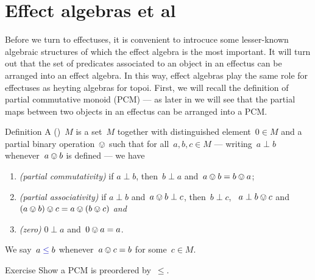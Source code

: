 \documentclass[b]{subfiles}
\begin{document}
\section{Effect algebras et al}
\begin{parsec}%
\begin{point}%
Before we turn to effectuses,
    it is convenient to introcuce some lesser-known algebraic structures
    of which the effect algebra is the most important.
It will turn out that the set of predicates associated to an object in
    an effectus can be arranged into an effect algebra.
In this way, effect algebras play the same role
    for effectuses as heyting algebras for topoi.
    First, we will recall the definition of partial commutative monoid (PCM)
    --- as later in  
    we will see that the partial maps between
    two objects in an effectus can be arranged into a PCM.
\end{point}
\begin{point}{Definition}%
    A  ()~$M$
        is a set~$M$ together with distinguished element~$0 \in M$
        and a partial binary operation~$\ovee$ such that
        for all~$a,b,c \in M$ 
        --- writing~$a \perp b$ whenever~$a \ovee b$ is defined
        --- we have
\begin{enumerate}
    \item \emph{(partial commutativity)}
        if $a \perp b$, then~$b \perp a$ and~$a \ovee b = b \ovee a$;
    \item \emph{(partial associativity)}
        if $a \perp b$ and~$a \ovee b \perp c$,
        then~$b \perp c$, ~$a \perp b \ovee c$
            and~$(a \ovee b) \ovee c = a \ovee (b \ovee c)$ \emph{and}
    \item \emph{(zero)}
        $0 \perp a$ and~$0 \ovee a = a$.
\end{enumerate}
We say~$a\mathrel{\Define{\leq}} b$
    whenever~$a \ovee c = b$ for some~$c \in M$.
\end{point}
\begin{point}{Exercise}%
Show a PCM is preordered by~$\leq$.
\end{point}
\end{parsec}
\end{document}
